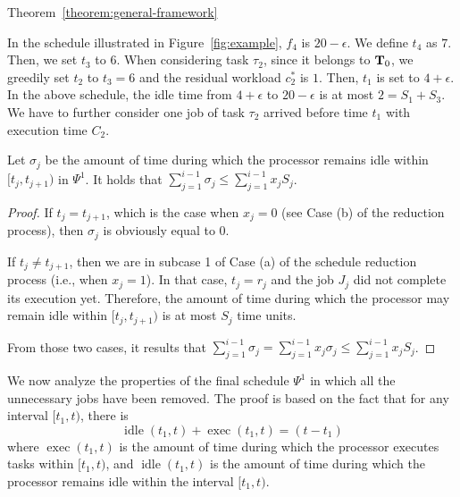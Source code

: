 \begin{appProof}{Theorem~\ref{theorem:general-framework}}
\begin{example}
In the schedule illustrated in Figure~\ref{fig:example}, $f_4$ is $20-\epsilon$.
We define $t_4$ as $7$. Then, we set $t_3$ to $6$. When considering
task $\tau_2$, since it belongs to ${\bf T}_0$, we greedily set $t_2$
to $t_3=6$ and the residual workload $c_2^*$ is $1$. Then, $t_1$ is set
to $4+\epsilon$. In the above schedule, the idle time from
$4+\epsilon$ to $20-\epsilon$ is at most $2 = S_1+S_3$. We have to
further consider one job of task $\tau_2$ arrived before time $t_1$
with execution time $C_2$.
\end{example}


\begin{Lemma}
\label{lem:max_idle}
Let $\sigma_j$ be the amount of time during which the processor remains idle within $[t_j, t_{j+1})$ in $\Psi^1$. It holds that $\sum_{j=1}^{i-1} \sigma_j \leq \sum_{j=1}^{i-1} x_j S_j$. %
\end{Lemma}
\begin{proof}
If $t_j = t_{j+1}$, which is the case when $x_j = 0$ (see Case (b) of the reduction process), then $\sigma_j$ is obviously equal to $0$. 

If $t_j \not= t_{j+1}$, then we are in subcase 1 of Case (a) of the schedule reduction process (i.e., when $x_j = 1$). In that case, $t_j = r_j$ and the job $J_j$ did not complete its execution yet. Therefore, the amount of time during which the processor may remain idle within $[t_j, t_{j+1})$ is at most $S_j$ time units. 

From those two cases, it results that $\sum_{j=1}^{i-1} \sigma_j = \sum_{j=1}^{i-1} x_j \sigma_j \leq \sum_{j=1}^{i-1} x_j S_j$.
\end{proof}



We now analyze the properties of the final schedule $\Psi^1$ in which all the unnecessary jobs have been removed. 
The proof is based on the fact that for any interval $[t_1, t)$, there is 
\begin{equation}
\label{eq:exec_plus_idle}
\operatorname{idle}(t_1, t) + \operatorname{exec}(t_1, t)  = (t - t_1)
\end{equation}
where $\operatorname{exec}(t_1, t)$ is the amount of time during which the processor executes tasks within $[t_1, t)$, and $\operatorname{idle}(t_1, t)$ is the amount of time during which the processor remains idle within the interval $[t_1, t)$.



\end{appProof}
